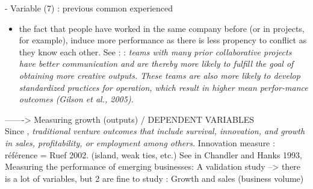 \begin{itemize}
\begin{itemize}
- Variable (7) : previous common experienced
\begin{itemize}
  \item the fact that people have worked in the same company before (or in projects, for example), induce more performance as there is less propency to conflict as they know each other. See : \citet{taylor2006superman} : \textit{teams with many prior collaborative projects have better communication and are thereby more likely to fulfill the goal of obtaining more creative outputs. These teams are also more likely to develop standardized practices for operation, which result in higher mean perfor-mance outcomes (Gilson et al., 2005).}
\end{itemize}

-------> Measuring growth (outputs) / DEPENDENT VARIABLES\\

Since \citet{marvel2016human}, \textit{traditional venture outcomes that include survival, innovation, and growth in sales, profitability, or employment among others.}\newline
Innovation measure : référence = Ruef 2002. (island, weak ties, etc.)
See in Chandler and Hanks 1993, Measuring the performance of emerging businesses: A validation study --> there is a lot of variables, but 2 are fine to study : Growth and sales (business volume)


\end{itemize}
\end{itemize}
